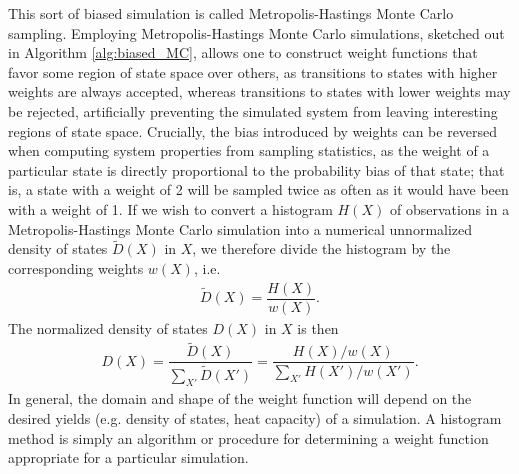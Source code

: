 \documentclass[11pt]{article}
\newcommand{\f}[2]{\dfrac{#1}{#2}} %
\newcommand{\p}[1]{\left(#1\right)} %
\begin{document}
This sort of biased simulation is called Metropolis-Hastings Monte
Carlo sampling. Employing Metropolis-Hastings Monte Carlo simulations,
sketched out in Algorithm \ref{alg:biased_MC}, allows one to construct
weight functions that favor some region of state space over others, as
transitions to states with higher weights are always accepted, whereas
transitions to states with lower weights may be rejected, artificially
preventing the simulated system from leaving interesting regions of
state space. Crucially, the bias introduced by weights can be reversed
when computing system properties from sampling statistics, as the
weight of a particular state is directly proportional to the
probability bias of that state; that is, a state with a weight of 2
will be sampled twice as often as it would have been with a weight of
1. If we wish to convert a histogram $H\p{X}$ of observations in a
Metropolis-Hastings Monte Carlo simulation into a numerical
unnormalized density of states $\tilde D\p{X}$ in $X$, we therefore
divide the histogram by the corresponding weights $w\p{X}$, i.e.
\begin{align}
  \tilde D\p{X}=\f{H\p{X}}{w\p{X}}.
  \label{eq:dos}
\end{align}
The normalized density of states $D\p{X}$ in $X$ is then
\begin{align}
  D\p{X}=\f{\tilde D\p{X}}{\sum_{X'}\tilde D\p{X'}}
  =\f{H\p{X}/w\p{X}}{\sum_{X'}H\p{X'}/w\p{X'}}.
  \label{eq:dos_norm}
\end{align}
In general, the domain and shape of the weight function will depend on
the desired yields (e.g.  density of states, heat capacity) of a
simulation. A histogram method is simply an algorithm or procedure for
determining a weight function appropriate for a particular simulation.
\end{document}
